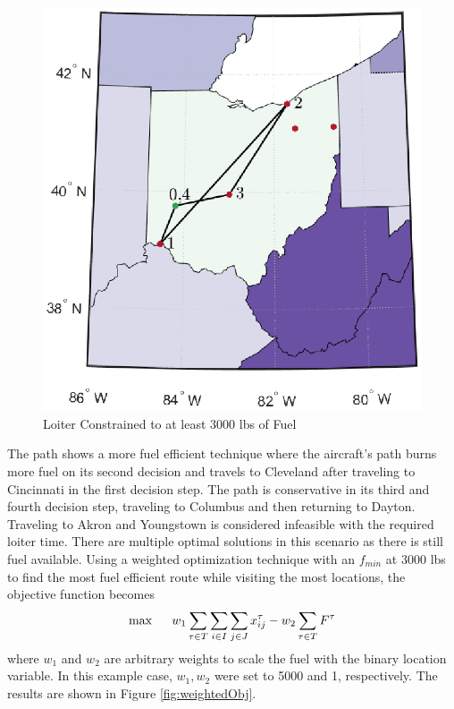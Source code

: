 \begin{figure}[H]
    \centering
    \includegraphics{Thesis/Method_II/fmin3000.eps}
    \caption{Loiter Constrained to at least 3000 lbs of Fuel}
    \label{fig:fmin3000}
\end{figure}
The path shows a more fuel efficient technique where the aircraft's path burns more fuel on its second decision and travels to Cleveland after traveling to Cincinnati in the first decision step. The path is conservative in its third and fourth decision step, traveling to Columbus and then returning to Dayton. Traveling to Akron and Youngstown is considered infeasible with the required loiter time. There are multiple optimal solutions in this scenario as there is still fuel available. Using a weighted optimization technique with an $f_{min}$ at $3000$ lbs to find the most fuel efficient route while visiting the most locations, the objective function becomes
\begin{equation}
    \max \hspace{.5cm} w_1\sum_{\tau\in T}\sum_{i\in I}\sum_{j\in J}x_{ij}^\tau-w_2\sum_{\tau\in T}F^\tau
\end{equation}
where $w_1$ and $w_2$ are arbitrary weights to scale the fuel with the binary location variable. In this example case, $w_1,w_2$ were set to 5000 and 1, respectively. The results are shown in Figure \ref{fig:weightedObj}.
